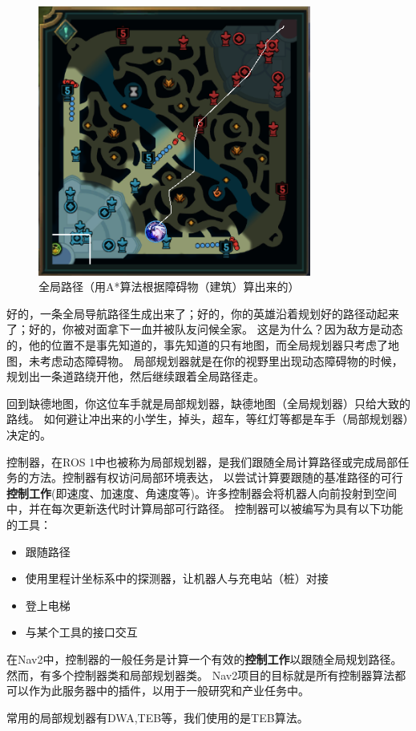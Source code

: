 \begin{figure}[H]
    \centering
    \includegraphics[width=0.8\textwidth]{./images/英雄联盟.png}
    \caption{全局路径（用A*算法根据障碍物（建筑）算出来的）}
\end{figure}
好的，一条全局导航路径生成出来了；好的，你的英雄沿着规划好的路径动起来了；好的，你被对面拿下一血并被队友问候全家。
这是为什么？因为敌方是动态的，他的位置不是事先知道的，事先知道的只有地图，而全局规划器只考虑了地图，未考虑动态障碍物。
局部规划器就是在你的视野里出现动态障碍物的时候，规划出一条道路绕开他，然后继续跟着全局路径走。

回到缺德地图，你这位车手就是局部规划器，缺德地图（全局规划器）只给大致的路线。
如何避让冲出来的小学生，掉头，超车，等红灯等都是车手（局部规划器）决定的。

控制器，在ROS 1中也被称为局部规划器，是我们跟随全局计算路径或完成局部任务的方法。控制器有权访问局部环境表达，
以尝试计算要跟随的基准路径的可行\textbf{控制工作}(即速度、加速度、角速度等)。许多控制器会将机器人向前投射到空间中，并在每次更新迭代时计算局部可行路径。
控制器可以被编写为具有以下功能的工具：
\begin{itemize}
    \item 跟随路径
    \item 使用里程计坐标系中的探测器，让机器人与充电站（桩）对接
    \item 登上电梯
    \item 与某个工具的接口交互
\end{itemize}
在Nav2中，控制器的一般任务是计算一个有效的\textbf{控制工作}以跟随全局规划路径。
然而，有多个控制器类和局部规划器类。
Nav2项目的目标就是所有控制器算法都可以作为此服务器中的插件，以用于一般研究和产业任务中。

常用的局部规划器有DWA,TEB等，我们使用的是TEB算法。
